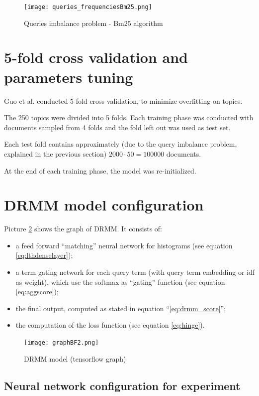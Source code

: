 \begin{figure}[H]
  \centering
  \texttt{[image: queries\_frequenciesBm25.png]}
  \caption{Queries imbalance problem - Bm25 algorithm}
  \label{fig:queries_frequencies_bm}
\end{figure}

\section{5-fold cross validation and parameters tuning}

Guo et al. conducted 5 fold cross validation, to minimize overfitting on topics.

The 250 topics were divided into 5 folds. Each training phase was conducted with documents sampled from 4 folds and the fold left out was used as test set.

Each test fold contains approximately (due to the query imbalance problem, explained in the previous section) $2000 \cdot 50 = 100000$ documents.

At the end of each training phase, the model was re-initialized.

\section{DRMM model configuration}

Picture \ref{fig:model_drmm} shows the graph of DRMM. It consists of:

\begin{itemize}
 \item a feed forward ``matching'' neural network for histograms (see equation \ref{eq:lthdenselayer});
 \item a term gating network for each query term (with query term embedding or idf as weight), which use the softmax as ``gating'' function (see equation \ref{eq:aggscore});
 \item the final output, computed as stated in equation ``\ref{eq:drmm_score}'';
 \item the computation of the loss function (see equation \ref{eq:hinge}).
\end{itemize}

\begin{figure}[H]
  \centering
  \texttt{[image: graphBF2.png]}
  \caption{DRMM model (tensorflow graph)}
  \label{fig:model_drmm}
\end{figure}

\subsection{Neural network configuration for experiment}

